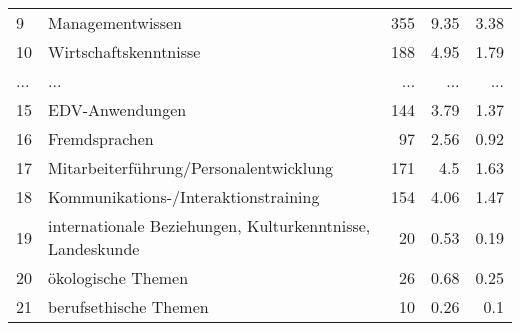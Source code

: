 \begin{longtable}{lXrrr}
        9 & \multicolumn{1}{X}{Managementwissen} & %
          \num{355} &
          \num[round-mode=places,round-precision=2]{9,35} &
          \num[round-mode=places,round-precision=2]{3,38} \\
        10 & \multicolumn{1}{X}{Wirtschaftskenntnisse} & %
          \num{188} &
          \num[round-mode=places,round-precision=2]{4,95} &
          \num[round-mode=places,round-precision=2]{1,79} \\
       ... & ... & ... & ... & ... \\
        15 & \multicolumn{1}{X}{EDV-Anwendungen} & %
          \num{144} &
          \num[round-mode=places,round-precision=2]{3,79} &
          \num[round-mode=places,round-precision=2]{1,37} \\

        16 & \multicolumn{1}{X}{Fremdsprachen} & %
          \num{97} &
          \num[round-mode=places,round-precision=2]{2,56} &
          \num[round-mode=places,round-precision=2]{0,92} \\

        17 & \multicolumn{1}{X}{Mitarbeiterführung/Personalentwicklung} & %
          \num{171} &
          \num[round-mode=places,round-precision=2]{4,5} &
          \num[round-mode=places,round-precision=2]{1,63} \\

        18 & \multicolumn{1}{X}{Kommunikations-/Interaktionstraining} & %
          \num{154} &
          \num[round-mode=places,round-precision=2]{4,06} &
          \num[round-mode=places,round-precision=2]{1,47} \\

        19 & \multicolumn{1}{X}{internationale Beziehungen, Kulturkenntnisse, Landeskunde} & %
          \num{20} &
          \num[round-mode=places,round-precision=2]{0,53} &
          \num[round-mode=places,round-precision=2]{0,19} \\

        20 & \multicolumn{1}{X}{ökologische Themen} & %
          \num{26} &
          \num[round-mode=places,round-precision=2]{0,68} &
          \num[round-mode=places,round-precision=2]{0,25} \\

        21 & \multicolumn{1}{X}{berufsethische Themen} & %
          \num{10} &
          \num[round-mode=places,round-precision=2]{0,26} &
          \num[round-mode=places,round-precision=2]{0,1} \\


\end{longtable}
